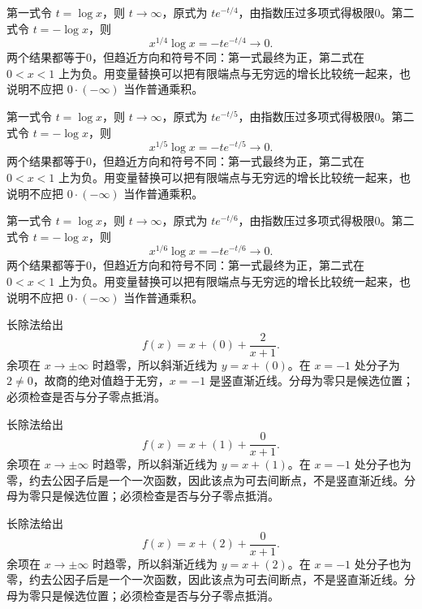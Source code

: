 \documentclass[UTF8,12pt,a4paper,fontset=fandol]{ctexart}
\begin{document}
\begin{solve}\label{ans:c4q16}
第一式令 $t=\log x$，则 $t\to\infty$，原式为 $te^{-t/4}$，由指数压过多项式得极限0。第二式令 $t=-\log x$，则
\[
x^{1/4}\log x=-te^{-t/4}\longrightarrow0.
\]
两个结果都等于0，但趋近方向和符号不同：第一式最终为正，第二式在 $0<x<1$ 上为负。用变量替换可以把有限端点与无穷远的增长比较统一起来，也说明不应把 $0\cdot(-\infty)$ 当作普通乘积。
\end{solve}

\begin{solve}\label{ans:c4q17}
第一式令 $t=\log x$，则 $t\to\infty$，原式为 $te^{-t/5}$，由指数压过多项式得极限0。第二式令 $t=-\log x$，则
\[
x^{1/5}\log x=-te^{-t/5}\longrightarrow0.
\]
两个结果都等于0，但趋近方向和符号不同：第一式最终为正，第二式在 $0<x<1$ 上为负。用变量替换可以把有限端点与无穷远的增长比较统一起来，也说明不应把 $0\cdot(-\infty)$ 当作普通乘积。
\end{solve}

\begin{solve}\label{ans:c4q18}
第一式令 $t=\log x$，则 $t\to\infty$，原式为 $te^{-t/6}$，由指数压过多项式得极限0。第二式令 $t=-\log x$，则
\[
x^{1/6}\log x=-te^{-t/6}\longrightarrow0.
\]
两个结果都等于0，但趋近方向和符号不同：第一式最终为正，第二式在 $0<x<1$ 上为负。用变量替换可以把有限端点与无穷远的增长比较统一起来，也说明不应把 $0\cdot(-\infty)$ 当作普通乘积。
\end{solve}

\begin{solve}\label{ans:c4q19}
长除法给出
\[
f(x)=x+(0)+\frac{2}{x+1}.
\]
余项在 $x\to\pm\infty$ 时趋零，所以斜渐近线为 $y=x+(0)$。在 $x=-1$ 处分子为 $2\ne0$，故商的绝对值趋于无穷，$x=-1$ 是竖直渐近线。分母为零只是候选位置；必须检查是否与分子零点抵消。
\end{solve}

\begin{solve}\label{ans:c4q20}
长除法给出
\[
f(x)=x+(1)+\frac{0}{x+1}.
\]
余项在 $x\to\pm\infty$ 时趋零，所以斜渐近线为 $y=x+(1)$。在 $x=-1$ 处分子也为零，约去公因子后是一个一次函数，因此该点为可去间断点，不是竖直渐近线。分母为零只是候选位置；必须检查是否与分子零点抵消。
\end{solve}

\begin{solve}\label{ans:c4q21}
长除法给出
\[
f(x)=x+(2)+\frac{0}{x+1}.
\]
余项在 $x\to\pm\infty$ 时趋零，所以斜渐近线为 $y=x+(2)$。在 $x=-1$ 处分子也为零，约去公因子后是一个一次函数，因此该点为可去间断点，不是竖直渐近线。分母为零只是候选位置；必须检查是否与分子零点抵消。
\end{solve}
\end{document}
